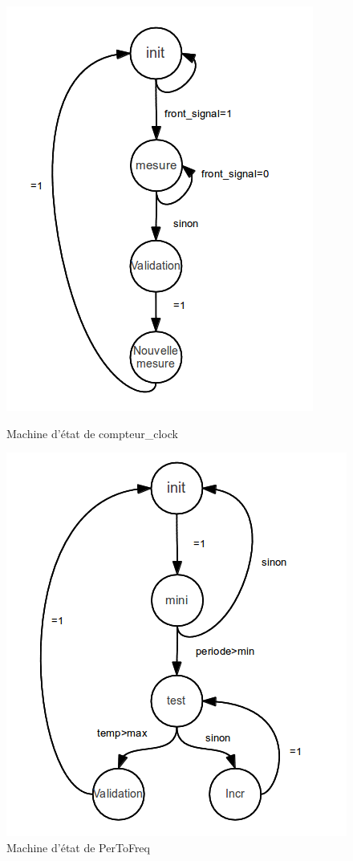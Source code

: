 \documentclass[a4paper,11pt]{article}
\begin{document}
  \begin{figure}[H]
   \begin{minipage}[b]{0.5\linewidth}
      \centering \includegraphics[scale=.6]{machine_compteurClk.png}
      \caption{Machine d'état de compteur\_clock}
   \end{minipage}\hfill
   \begin{minipage}[b]{0.5\linewidth}   
      \centering \includegraphics[scale=.6]{machine_PertoFreq.png}
      \caption{Machine d'état de PerToFreq}
   \end{minipage}
 \end{figure}
\end{document}
